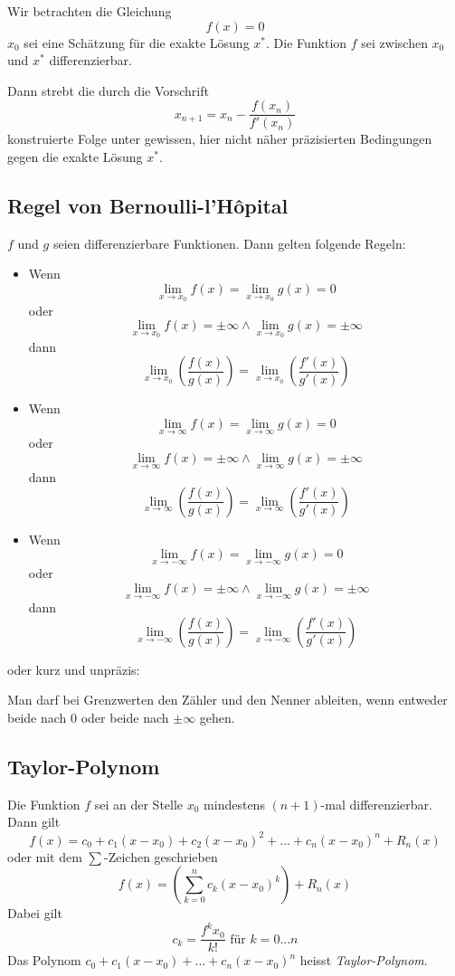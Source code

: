 Wir betrachten die Gleichung
%
\begin{displaymath}
f(x) = 0
\end{displaymath}
%
$x_0$ sei eine Schätzung für die exakte Lösung $x^*$. Die Funktion $f$ sei zwischen $x_0$ und $x^*$
differenzierbar.

Dann strebt die durch die Vorschrift
%
\begin{displaymath}
	x_{n+1} = x_n - \frac{f(x_n)}{f'(x_n)}
\end{displaymath}
%
konstruierte Folge unter gewissen, hier nicht näher präzisierten Bedingungen gegen die exakte Lösung
$x^*$.


\subsection{Regel von Bernoulli-l'Hôpital}

$f$ und $g$ seien differenzierbare Funktionen. Dann gelten folgende Regeln:

\begin{itemize}
	\item Wenn \[\lim_{x \to x_0}f(x) = \lim_{x \to x_0}g(x) = 0\]
	oder \[\lim_{x \to x_0}f(x) = \pm \infty \wedge \lim_{x \to x_0}g(x) = \pm \infty\]
	dann \[\lim_{x \to x_0}\left(\frac{f(x)}{g(x)}\right) = \lim_{x \to x_0}\left(\frac{f'(x)}{g'(x)}\right)\]
	\item Wenn \[\lim_{x \to \infty}f(x) = \lim_{x \to \infty}g(x) = 0\]
	oder \[\lim_{x \to \infty}f(x) = \pm \infty \wedge \lim_{x \to \infty}g(x) = \pm \infty\]
	dann \[\lim_{x \to \infty}\left(\frac{f(x)}{g(x)}\right) = \lim_{x \to \infty}\left(\frac{f'(x)}{g'(x)}\right)\]
	\item Wenn \[\lim_{x \to -\infty}f(x) = \lim_{x \to -\infty}g(x) = 0\]
	oder \[\lim_{x \to -\infty}f(x) = \pm \infty \wedge \lim_{x \to -\infty}g(x) = \pm \infty\]
	dann \[\lim_{x \to -\infty}\left(\frac{f(x)}{g(x)}\right) = \lim_{x \to -\infty}\left(\frac{f'(x)}{g'(x)}\right)\]
\end{itemize}
oder kurz und unpräzis:

Man darf bei Grenzwerten den Zähler und den Nenner ableiten, wenn entweder beide nach $0$ oder beide
nach $\pm \infty$ gehen.


\subsection{Taylor-Polynom}

Die Funktion $f$ sei an der Stelle $x_0$ mindestens $(n + 1)$-mal differenzierbar. Dann gilt
%
\begin{displaymath}
	f(x) = c_0 + c_1(x-x_0) + c_2(x-x_0)^2 + ... + c_n(x-x_0)^n + R_n(x)
\end{displaymath}
%
oder mit dem $\sum$-Zeichen geschrieben
%
\begin{displaymath}
	f(x) = \left(\sum_{k=0}^n c_k(x-x_0)^k\right) + R_n(x)
\end{displaymath}
%
Dabei gilt
%
\begin{displaymath}
	c_k = \frac{f^kx_0}{k!}\textrm{ für }k=0...n
\end{displaymath}
%
Das Polynom $c_0 + c_1(x-x_0)+...+c_n(x-x_0)^n$ heisst \textit{Taylor-Polynom}.

